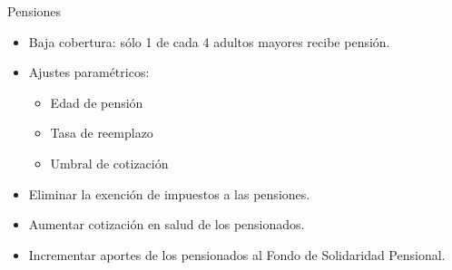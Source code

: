 \begin{frame}{Pensiones}
\begin{itemize}
    \item Baja cobertura: sólo 1 de cada 4 adultos mayores recibe pensión.

    \item Ajustes paramétricos: 
    \begin{itemize}
        \item Edad de pensión
        \item Tasa de reemplazo
        \item Umbral de cotización
    \end{itemize}    
    \item Eliminar la exención de impuestos a las pensiones.
    \item Aumentar cotización en salud de los pensionados.
    \item Incrementar aportes de los pensionados al Fondo de Solidaridad Pensional.
\end{itemize}
\end{frame}

